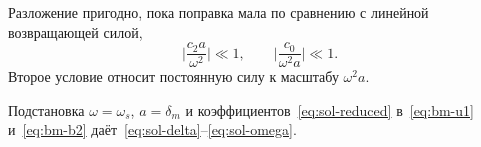 Разложение пригодно, пока поправка мала по сравнению с линейной возвращающей силой,
\begin{equation}
\label{eq:bm-valid}
\biggl|\frac{c_2 a}{\omega^2}\biggr|\ll 1,
\qquad
\biggl|\frac{c_0}{\omega^2 a}\biggr|\ll 1.
\end{equation}
Второе условие относит постоянную силу к масштабу $\omega^2 a$.

Подстановка $\omega=\omega_s$, $a=\delta_m$ и коэффициентов~\eqref{eq:sol-reduced} в~\eqref{eq:bm-u1} и~\eqref{eq:bm-b2} даёт~\eqref{eq:sol-delta}--\eqref{eq:sol-omega}.
